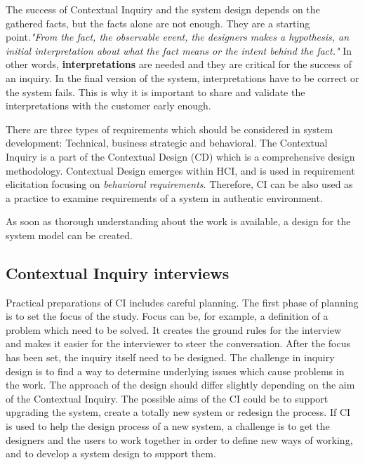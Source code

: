 \documentclass[12pt,a4paper,oneside,pdftex]{report}
\begin{document}
The success of Contextual Inquiry and the system design depends on the gathered facts, but the facts alone are not enough. They are a starting point.\textit{"From the fact, the observable event, the designers makes a hypothesis, an initial interpretation about what the fact means or the intent behind the fact."}\cite{RefWorks:21} In other words, \textbf{interpretations} are needed and they are critical for the success of an inquiry. In the final version of the system, interpretations have to be correct or the system fails. This is why it is important to share and validate the interpretations with the customer early enough. \cite{RefWorks:21}

There are three types of requirements which should be considered in system development: Technical, business strategic and behavioral. The Contextual Inquiry is a part of the Contextual Design (CD) which is a comprehensive design methodology. Contextual Design emerges within HCI, and is used in requirement elicitation focusing on \emph{behavioral requirements}. Therefore, CI can be also used as a practice to examine requirements of a system in authentic environment. \cite{RefWorks:33, RefWorks:36}

As soon as thorough understanding about the work is available, a design for the system model can be created.\cite{RefWorks:14} 

\subsection{Contextual Inquiry interviews}

Practical preparations of CI includes careful planning. The first phase of planning is to set the focus of the study. Focus can be, for example, a definition of a problem which need to be solved. It creates the ground rules for the interview and makes it easier for the interviewer to steer the conversation. After the focus has been set, the inquiry itself need to be designed. The challenge in inquiry design is to find a way to determine underlying issues which cause problems in the work. The approach of the design should differ slightly depending on the aim of the Contextual Inquiry. The possible aims of the CI could be to support upgrading the system, create a totally new system or redesign the process. If CI is used to help the design process of a new system, a challenge is to get the designers and the users to work together in order to define new ways of working, and to develop a system design to support them. \cite{RefWorks:21} 
\end{document}
